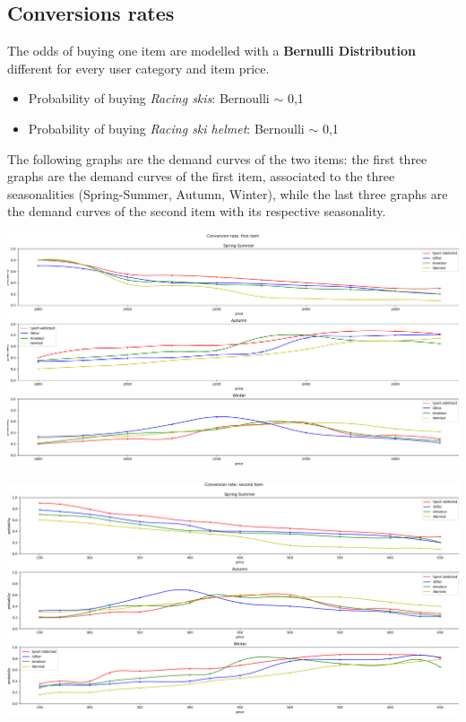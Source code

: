 \subsection*{Conversions rates}
The odds of buying one item are modelled with a \textbf{Bernulli Distribution} different for every user category and item price. 
\begin{itemize}
	\item Probability of buying \textit{Racing skis}: Bernoulli $\sim$ 0,1
	\item Probability of buying \textit{Racing ski helmet}: Bernoulli $\sim$ 0,1
\end{itemize}
The following graphs are the demand curves of the two items: the first three graphs are the demand curves of the first item, associated to the three seasonalities (Spring-Summer, Autumn, Winter), while the last three graphs are the demand curves of the second item with its respective seasonality.
\begin{center}
	\includegraphics[scale=0.3]{Images/CR_fstItem}
\end{center}

\begin{center}
	\includegraphics[scale=0.3]{Images/CR_scndItem}
\end{center}

